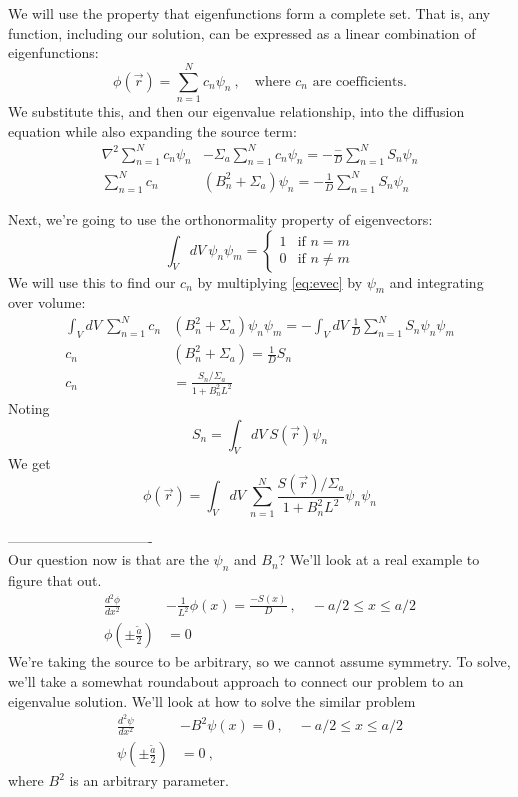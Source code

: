 \documentclass[12pt]{article}
\begin{document}
We will use the property that eigenfunctions form a complete set. That is, any function, including our solution, can be expressed as a linear combination of eigenfunctions:
\[
\phi(\vec{r}) = \sum_{n=1}^N c_n \psi_n\:, \quad \text{where } c_n \text{ are coefficients.}
\]
We substitute this, and then our eigenvalue relationship, into the diffusion equation while also expanding the source term:
\begin{align}
\nabla^2\sum_{n=1}^N c_n \psi_n &- \Sigma_a\sum_{n=1}^N c_n \psi_n = -\frac{-}{D}\sum_{n=1}^N S_n \psi_n \nonumber \\
%
\sum_{n=1}^N c_n &(B_n^2 + \Sigma_a)\psi_n = -\frac{1}{D}\sum_{n=1}^N S_n \psi_n
\label{eq:evec}
\end{align}

Next, we're going to use the orthonormality property of eigenvectors:
\[
\int_V dV\: \psi_n \psi_m = \left\{
	\begin{array}{ll}
		1  & \mbox{if } n = m \\
		0 & \mbox{if } n \neq m
	\end{array}
	\right.
\]
We will use this to find our $c_n$ by multiplying \autoref{eq:evec} by $\psi_m$ and integrating over volume:
\begin{align*}
\int_V dV\: \sum_{n=1}^N c_n &(B_n^2 + \Sigma_a)\psi_n \psi_m = -\int_V dV\:\frac{1}{D}\sum_{n=1}^N S_n \psi_n \psi_m \\
%
c_n &(B_n^2 + \Sigma_a) = \frac{1}{D} S_n\\
c_n &= \frac{S_n / \Sigma_a}{1 + B_n^2  L^2}
\end{align*}
Noting 
\[
S_n = \int_V dV\: S(\vec{r}) \psi_n
\]
We get
\[
\phi(\vec{r}) = \int_V dV\:\sum_{n=1}^N \frac{S(\vec{r}) / \Sigma_a}{1 + B_n^2  L^2} \psi_n \psi_n 
\]


-------------------------------\\
Our question now is that are the $\psi_n$ and $B_n$?
We'll look at a real example to figure that out. %
\begin{align*}
\frac{d^2 \phi}{dx^2} &- \frac{1}{L^2} \phi(x) = \frac{-S(x)}{D}\:, \quad -a/2 \leq x \leq a/2\\
\phi(\pm \frac{\tilde{a}}{2}) &= 0
\end{align*}
We're taking the source to be arbitrary, so we cannot assume symmetry. To solve, we'll take a somewhat roundabout approach to connect our problem to an eigenvalue solution. We'll look at how to solve the similar problem
\begin{align*}
\frac{d^2 \psi}{dx^2} &- B^2 \psi(x) = 0\:, \quad -a/2 \leq x \leq a/2\\
\psi(\pm \frac{\tilde{a}}{2}) &= 0\:,
\end{align*}
where $B^2$ is an arbitrary parameter.
\end{document}
